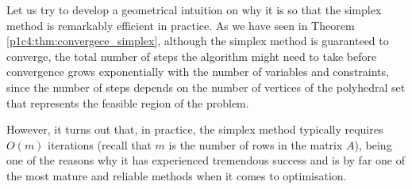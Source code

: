Let us try to develop a geometrical intuition on why it is so that the simplex method is remarkably efficient in practice. As we have seen in Theorem \ref{p1c4:thm:convergece_simplex}, although the simplex method is guaranteed to converge, the total number of steps the algorithm might need to take before convergence grows exponentially with the number of variables and constraints, since the number of steps depends on the number of vertices of the polyhedral set that represents the feasible region of the problem. 

However, it turns out that, in practice, the simplex method typically requires $O(m)$ iterations (recall that $m$ is the number of rows in the matrix $A$), being one of the reasons why it has experienced tremendous success and is by far one of the most mature and reliable methods when it comes to optimisation. 

